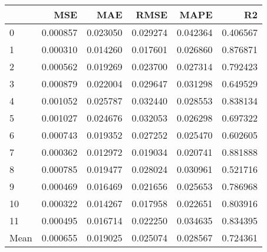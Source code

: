 \begin{tabular}{lrrrrr}
\toprule
 & MSE & MAE & RMSE & MAPE & R2 \\
\midrule
0 & 0.000857 & 0.023050 & 0.029274 & 0.042364 & 0.406567 \\
1 & 0.000310 & 0.014260 & 0.017601 & 0.026860 & 0.876871 \\
2 & 0.000562 & 0.019269 & 0.023700 & 0.027314 & 0.792423 \\
3 & 0.000879 & 0.022004 & 0.029647 & 0.031298 & 0.649529 \\
4 & 0.001052 & 0.025787 & 0.032440 & 0.028553 & 0.838134 \\
5 & 0.001027 & 0.024676 & 0.032053 & 0.026298 & 0.697322 \\
6 & 0.000743 & 0.019352 & 0.027252 & 0.025470 & 0.602605 \\
7 & 0.000362 & 0.012972 & 0.019034 & 0.020741 & 0.881888 \\
8 & 0.000785 & 0.019477 & 0.028024 & 0.030961 & 0.521716 \\
9 & 0.000469 & 0.016469 & 0.021656 & 0.025653 & 0.786968 \\
10 & 0.000322 & 0.014267 & 0.017958 & 0.022651 & 0.803916 \\
11 & 0.000495 & 0.016714 & 0.022250 & 0.034635 & 0.834395 \\
Mean & 0.000655 & 0.019025 & 0.025074 & 0.028567 & 0.724361 \\
\bottomrule
\end{tabular}
